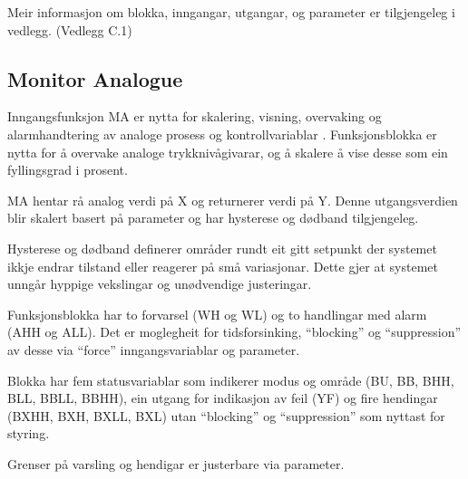 Meir informasjon om blokka, inngangar, utgangar, og parameter er tilgjengeleg i vedlegg. (Vedlegg C.1)

\newpage

\subsection{Monitor Analogue}
Inngangsfunksjon \gls{MA} er nytta for skalering, visning, overvaking og alarmhandtering av
analoge prosess og kontrollvariablar \citep{IEC-63131}.
Funksjonsblokka er nytta for å overvake analoge trykknivågivarar, 
og å skalere å vise desse som ein fyllingsgrad i prosent.

\gls{MA} hentar rå analog verdi på X og returnerer verdi på Y.
Denne utgangsverdien blir skalert basert på parameter og har hysterese og dødband tilgjengeleg.

Hysterese og dødband definerer områder rundt eit gitt setpunkt der systemet 
ikkje endrar tilstand eller reagerer på små variasjonar.
Dette gjer at systemet unngår hyppige vekslingar og unødvendige justeringar.

Funksjonsblokka har to forvarsel (WH og WL) og to handlingar med alarm (AHH og ALL).
Det er moglegheit for tidsforsinking, ``blocking'' og ``suppression'' av desse via ``force'' inngangsvariablar og parameter.

Blokka har fem statusvariablar som indikerer modus og område (BU, BB, BHH, BLL, BBLL, BBHH), ein utgang for indikasjon av feil (YF)
og fire hendingar (BXHH, BXH, BXLL, BXL) utan ``blocking'' og ``suppression'' som nyttast for styring.

Grenser på varsling og hendigar er justerbare via parameter.

